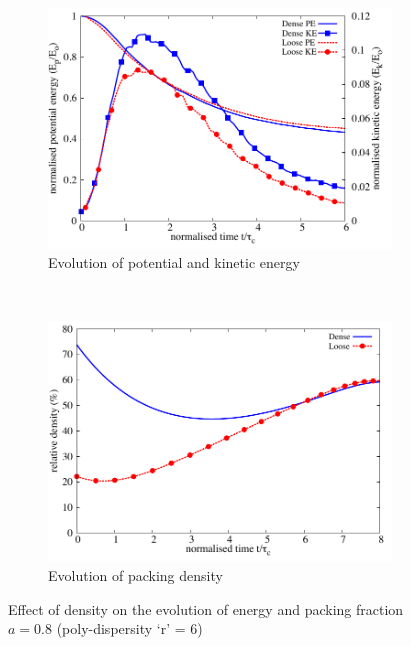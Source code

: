 \begin{figure}[tbhp]
\centering
\begin{subfigure}[b]{0.75\textwidth}
\centering
\includegraphics[width=\textwidth]{Energy_dense_r6}
\caption{Evolution of potential and kinetic energy}
\label{fig:Energy_dense_r6}
\end{subfigure}
\\
\begin{subfigure}[b]{0.75\textwidth}
\centering
\includegraphics[width=\textwidth]{voro_r6}
\caption{Evolution of packing density}
\label{fig:voro_r6}
\end{subfigure}
\caption{Effect of density on the evolution of energy and packing fraction $a = 
0.8$ (poly-dispersity `r' = 6)}
\label{fig:Energy_voro_r6}
\end{figure}

